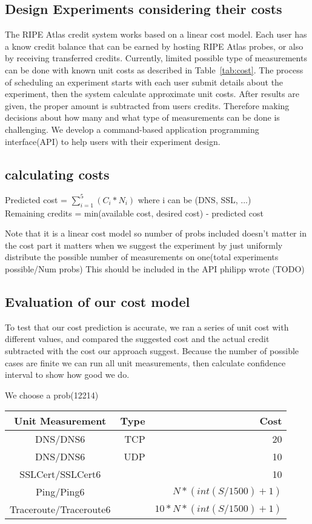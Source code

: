 \subsection{Design Experiments considering their costs}

The RIPE Atlas credit system works based on a linear cost model. Each user has a know credit balance that can be earned by hosting RIPE Atlas probes, or also by receiving transferred credits. Currently, limited possible type of measurements can be done with known unit costs as described in Table~\ref{tab:cost}. The process of scheduling an experiment starts with each user submit details about the experiment, then the system calculate approximate unit costs. After results are given, the proper amount is subtracted from users credits. Therefore making decisions about how many and what type of measurements can be done is challenging. We develop a command-based application programming interface(API) to help users with their experiment design. 

\subsection{calculating costs}

Predicted cost = $\sum_{i=1}^{5} (C_i * N_i)$  where i can be (DNS, SSL, ...)\\
Remaining credits = min(available cost, desired cost) - predicted cost

Note that it is a linear cost model so number of probs included doesn't matter in the cost part it matters when we suggest the experiment by just uniformly distribute the possible number of measurements on one(total experiments possible/Num probs)
This should be included in the API philipp wrote (TODO)

\subsection{Evaluation of our cost model}
To test that our cost prediction is accurate, we ran a series of unit cost with different values, and compared  the suggested cost and the actual credit subtracted with the cost our approach suggest. Because the number of possible cases are finite we can run all unit measurements, then calculate confidence interval to show how good we do.

We choose a prob(12214) 

\begin{table*}[ht!] 
\centering
\begin{tabular}{c rr}
\hline\hline 
Unit Measurement& Type & Cost \\ [0.5ex] 
\hline 
DNS\slash DNS6 & TCP & 20\\ 
DNS\slash DNS6 & UDP & 10\\ 
SSLCert\slash SSLCert6 & & 10 \\
Ping\slash Ping6 & & $N * (int(S/1500)+1)$\\
Traceroute\slash Traceroute6 & & $ 10*N*(int(S/1500)+1)$\\[1ex] 
\hline 
\end{tabular} 
\caption{Measurement Cost Model where N and S are number of packet in the train and packet size, respectively.} 
\label{tab:cost} 
\end{table*} 
